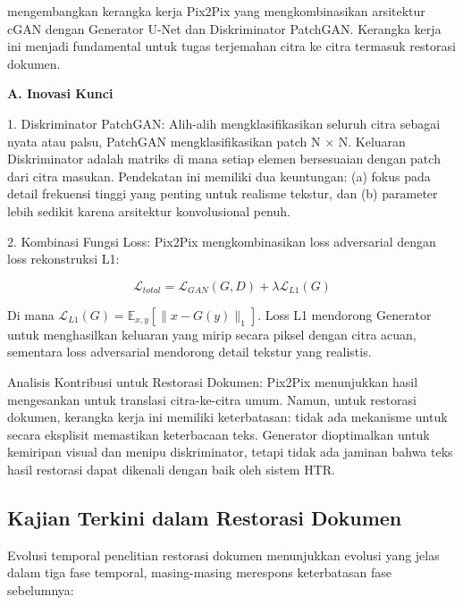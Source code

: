\vspace{1.5ex}

\citep{isola2017} mengembangkan kerangka kerja Pix2Pix yang mengkombinasikan arsitektur cGAN dengan Generator U-Net dan Diskriminator PatchGAN. Kerangka kerja ini menjadi fundamental untuk tugas terjemahan citra ke citra termasuk restorasi dokumen.

\vspace{0.5ex}
\noindent\textbf{A. Inovasi Kunci}

1. Diskriminator PatchGAN: Alih-alih mengklasifikasikan seluruh citra sebagai nyata atau palsu, PatchGAN mengklasifikasikan patch N × N. Keluaran Diskriminator adalah matriks di mana setiap elemen bersesuaian dengan patch dari citra masukan. Pendekatan ini memiliki dua keuntungan: (a) fokus pada detail frekuensi tinggi yang penting untuk realisme tekstur, dan (b) parameter lebih sedikit karena arsitektur konvolusional penuh.

2. Kombinasi Fungsi Loss: Pix2Pix mengkombinasikan loss adversarial dengan loss rekonstruksi L1:

\begin{equation}
\mathcal{L}_{total} = \mathcal{L}_{GAN}(G, D) + \lambda \mathcal{L}_{L1}(G)
\end{equation}

Di mana $\mathcal{L}_{L1}(G) = \mathbb{E}_{x, y}[\|x - G(y)\|_1]$. Loss L1 mendorong Generator untuk menghasilkan keluaran yang mirip secara piksel dengan citra acuan, sementara loss adversarial mendorong detail tekstur yang realistis.

Analisis Kontribusi untuk Restorasi Dokumen: Pix2Pix menunjukkan hasil mengesankan untuk translasi citra-ke-citra umum. Namun, untuk restorasi dokumen, kerangka kerja ini memiliki keterbatasan: tidak ada mekanisme untuk secara eksplisit memastikan keterbacaan teks. Generator dioptimalkan untuk kemiripan visual dan menipu diskriminator, tetapi tidak ada jaminan bahwa teks hasil restorasi dapat dikenali dengan baik oleh sistem HTR.



\subsection{Kajian Terkini dalam Restorasi Dokumen}
\label{subsec:sota-analysis}

\vspace{1.5ex}

Evolusi temporal penelitian restorasi dokumen menunjukkan evolusi yang jelas dalam tiga fase temporal, masing-masing merespons keterbatasan fase sebelumnya:

